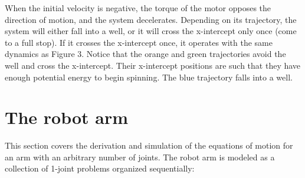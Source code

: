 \documentclass{article}
\begin{document}
\newpage
\centering When the initial velocity is negative, the torque of the motor opposes the direction of motion, and the system decelerates. Depending on its trajectory, the system will either fall into a well, or it will cross the x-intercept only once (come to a full stop). If it crosses the x-intercept once, it operates with the same dynamics as Figure 3. Notice that the orange and green trajectories avoid the well and cross the x-intercept. Their x-intercept positions are such that they have enough potential energy to begin spinning. The blue trajectory falls into a well. 

\begin{center}
%
\label{labelname}%
\end{center}


\section{The robot arm}
\centering This section covers the derivation and simulation of the equations of motion for an arm with an arbitrary number of joints. The robot arm is modeled as a collection of 1-joint problems organized sequentially:

\vspace{24pt}
\end{document}
